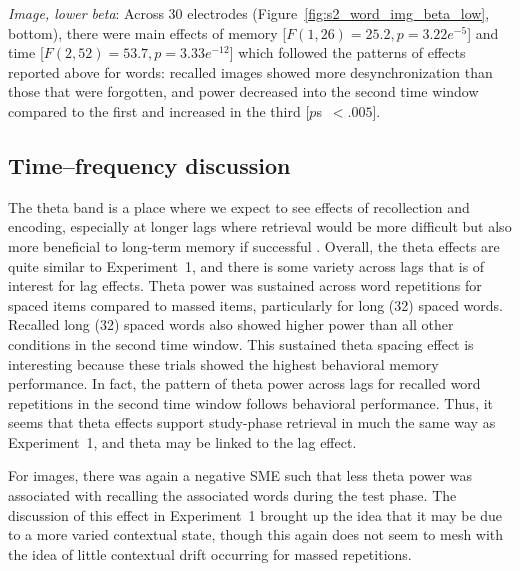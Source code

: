 \textit{Image, lower beta}: Across 30 electrodes (Figure~\ref{fig:s2_word_img_beta_low}, bottom), there were main effects of memory [$F(1,26)=25.2, p=3.22e^{-5}$] and time [$F(2,52)=53.7, p=3.33e^{-12}$] which followed the patterns of effects reported above for words: recalled images showed more desynchronization than those that were forgotten, and power decreased into the second time window compared to the first and increased in the third [$p$s~$<.005$].

\subsection{Time--frequency discussion}


The theta band is a place where we expect to see effects of recollection and encoding,
especially at longer lags where retrieval would be more difficult but also more beneficial to long-term memory if successful
\cite{DelaEtal2010,PavlAnde2005}.
Overall, the theta effects are quite similar to Experiment~1, and there is some variety across lags that is of interest for lag effects.
Theta power was sustained across word repetitions for spaced items compared to massed items, particularly for long (32) spaced words.  Recalled long (32) spaced words also showed higher power than all other conditions in the second time window.
This sustained theta spacing effect is interesting because these trials showed the highest behavioral memory performance.  In fact, the pattern of theta power across lags for recalled word repetitions in the second time window follows behavioral performance.  Thus, it seems that theta effects support study-phase retrieval in much the same way as Experiment~1, and theta may be linked to the lag effect.

For images, there was again a negative SME such that less theta power was associated with recalling the associated words during the test phase.  The discussion of this effect in Experiment~1 brought up the idea that it may be due to a more varied contextual state, though this again does not seem to mesh with the idea of little contextual drift occurring for massed repetitions.


